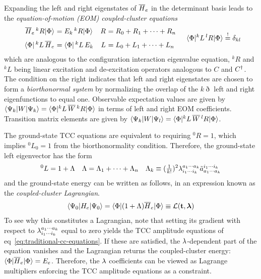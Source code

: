 \documentclass[11pt]{article}
\numberwithin{equation}{section}
\begin{document}
\begin{dfn}
Expanding the left and right eigenstates of $\overline{H}_e$ in the determinant basis leads to the \textit{equation-of-motion (EOM) coupled-cluster equations}
\begin{align}
\begin{array}{r@{\ }lr@{\ }l}
  \ol{H}_e
  \,{}^kR
  \kt{\F}
&
=
  E_k
  \,{}^kR
  \kt{\F}
&
  R
&=
  R_0
+
  R_1
+
  \cd
+
  R_n
\\[7pt]
  \br{\F}
  \,{}^kL\,
  \ol{H}_e
&=
  \br{\F}
  \,{}^kL\,
  E_k
&
  L
&=
  L_0
+
  L_1
+
  \cd
+
  L_n
\end{array}
&&
  \ip{\F|
    {}^kL\,
    {}^lR
  |\F}
\overset{!}{=}
  \d_{kl}
\end{align}
which are analogous to the configuration interaction eigenvalue equation, ${}^kR$ and ${}^kL$ being linear excitation and de-excitation operators analogous to $C$ and $C^\dagger$.
The condition on the right indicates that left and right eigenstates are chosen to form a \textit{biorthonormal system} by normalizing the overlap of the $k\eth$ left and right eigenfunctions to equal one.
Observable expectation values are given by
$
  \langle\Psi _k|W|\Psi _k\rangle
=
  \langle\Phi |{}^kL\,\overline{W}\,{}^kR|\Phi \rangle
$
in terms of left and right EOM coefficients.
Transition matrix elements are given by
$
  \langle\Psi _k|W|\Psi _l\rangle
=
  \langle\Phi |{}^kL\,\overline{W}\,{}^lR|\Phi \rangle
$.
\end{dfn}

\begin{dfn}
The ground-state TCC equations are equivalent to requiring ${}^0R=1$, which implies ${}^0L_0=1$ from the biorthonormality condition.
Therefore, the ground-state left eigenvector has the form
\begin{align}
\label{eq:cc-ground-state-wave-operators}
  {}^0L
=
  1
+
  \Lambda 
&&
  \Lambda 
=
  \Lambda _1
+
  \cdots
+
  \Lambda _n
&&
  \Lambda _k
\equiv
  (\tfrac{1}{k!})^2
  \lambda _{i_1\cdots i_k}^{a_1\cdots a_k}
  \tilde{a}^{i_1\cdots i_k}_{a_1\cdots a_k}
\end{align}
and the ground-state energy can be written as follows, in an expression known as the \textit{coupled-cluster Lagrangian}.
\begin{align}
  \ip{\Y_0|H_e|\Y_0}
=
  \ip{\F|
    (
      1
    +
      \La
    )
    \ol{H}_e
  |\F}
\equiv
  \mc{L}(\bo{t},\bm{\la})
\end{align}
To see why this constitutes a Lagrangian, note that setting its gradient with respect to $\lambda _{i_1\cdots i_k}^{a_1\cdots a_k}$ equal to zero yields the TCC amplitude equations of eq~\ref{eq:traditional-cc-equations}.
If these are satisfied, the $\lambda $-dependent part of the equation vanishes and the Lagrangian returns the coupled-cluster energy:
$
  \langle\Phi |\overline{H}_e|\Phi \rangle
=
  E_e
$.
Therefore, the $\lambda $ coefficients can be viewed as Lagrange multipliers enforcing the TCC amplitude equations as a constraint.
\end{dfn}
\end{document}

